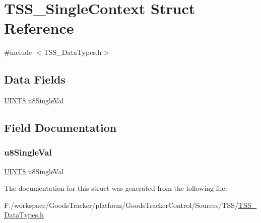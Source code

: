 \hypertarget{struct_t_s_s___single_context}{}\section{T\+S\+S\+\_\+\+Single\+Context Struct Reference}
\label{struct_t_s_s___single_context}


{\ttfamily \#include $<$T\+S\+S\+\_\+\+Data\+Types.\+h$>$}

\subsection*{Data Fields}
\begin{DoxyCompactItemize}
\item 
\hyperlink{_t_s_s___data_types_8h_ab27e9918b538ce9d8ca692479b375b6a}{U\+I\+N\+T8} \hyperlink{struct_t_s_s___single_context_a6dfc5c5b64522012efa2bf9eb0c23e09}{u8\+Single\+Val}
\end{DoxyCompactItemize}


\subsection{Field Documentation}
\mbox{\label{struct_t_s_s___single_context_a6dfc5c5b64522012efa2bf9eb0c23e09}} 
\subsubsection{\texorpdfstring{u8\+Single\+Val}{u8SingleVal}}
{\footnotesize\ttfamily \hyperlink{_t_s_s___data_types_8h_ab27e9918b538ce9d8ca692479b375b6a}{U\+I\+N\+T8} u8\+Single\+Val}



The documentation for this struct was generated from the following file\+:\begin{DoxyCompactItemize}
\item 
F\+:/workspace/\+Goods\+Tracker/platform/\+Goods\+Tracker\+Control/\+Sources/\+T\+S\+S/\hyperlink{_t_s_s___data_types_8h}{T\+S\+S\+\_\+\+Data\+Types.\+h}\end{DoxyCompactItemize}
